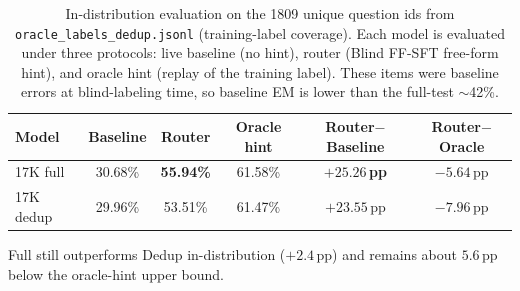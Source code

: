 \begin{table}[t]
\centering
\small
\setlength{\tabcolsep}{5pt}
\caption{In-distribution evaluation on the 1809 unique question ids from
\texttt{oracle\_labels\_dedup.jsonl} (training-label coverage).
Each model is evaluated under three protocols: live baseline (no hint),
router (Blind FF-SFT free-form hint), and oracle hint (replay of the
training label).
These items were baseline errors at blind-labeling time, so baseline EM
is lower than the full-test $\sim$42\%.}
\label{tab:idist-1809}
\begin{tabular}{lccccc}
\toprule
\textbf{Model} & \textbf{Baseline} & \textbf{Router} & \textbf{Oracle hint}
  & \textbf{Router$-$Baseline} & \textbf{Router$-$Oracle} \\
\midrule
17K full
  & 30.68\%
  & \textbf{55.94\%}
  & 61.58\%
  & \textcolor{green!60!black}{\textbf{$+25.26$\,pp}}
  & $-5.64$\,pp \\
17K dedup
  & 29.96\%
  & 53.51\%
  & 61.47\%
  & \textcolor{green!60!black}{$+23.55$\,pp}
  & $-7.96$\,pp \\
\bottomrule
\end{tabular}

\vspace{0.25em}
{\scriptsize
Full still outperforms Dedup in-distribution ($+2.4$\,pp) and remains about
$5.6$\,pp below the oracle-hint upper bound.
}
\end{table}

